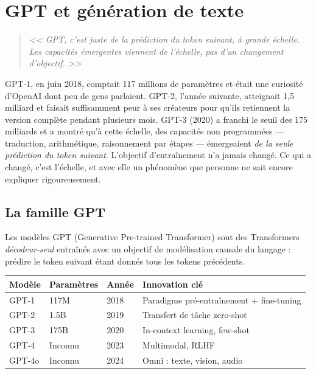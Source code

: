 \chapter{GPT et g\'en\'eration de texte}
\label{ch:gpt-generation}

\begin{quote}
\emph{<< GPT, c'est juste de la pr\'ediction du token suivant, \`a grande \'echelle. Les capacit\'es \'emergentes viennent de l'\'echelle, pas d'un changement d'objectif. >>}
\end{quote}

GPT-1, en juin 2018, comptait 117 millions de paramètres et était une curiosité d'OpenAI dont peu de gens parlaient. GPT-2, l'année suivante, atteignait 1,5 milliard et faisait suffisamment peur à ses créateurs pour qu'ils retiennent la version complète pendant plusieurs mois. GPT-3 (2020) a franchi le seuil des 175 milliards et a montré qu'à cette échelle, des capacités non programmées --- traduction, arithmétique, raisonnement par étapes --- émergeaient \emph{de la seule prédiction du token suivant}. L'objectif d'entraînement n'a jamais changé. Ce qui a changé, c'est l'échelle, et avec elle un phénomène que personne ne sait encore expliquer rigoureusement.
\section{La famille GPT}

Les mod\`eles GPT (Generative Pre-trained Transformer) sont des Transformers \emph{d\'ecodeur-seul} entra\^in\'es avec un objectif de mod\'elisation causale du langage : pr\'edire le token suivant \'etant donn\'es tous les tokens pr\'ec\'edents.

\begin{longtable}{p{2.5cm}p{2.5cm}p{2.5cm}p{4.5cm}}
\toprule
\textbf{Mod\`ele} & \textbf{Param\`etres} & \textbf{Ann\'ee} & \textbf{Innovation cl\'e} \\
\midrule
GPT-1 & 117M & 2018 & Paradigme pr\'e-entra\^inement + fine-tuning \\
GPT-2 & 1.5B & 2019 & Transfert de t\^ache zero-shot \\
GPT-3 & 175B & 2020 & In-context learning, few-shot \\
GPT-4 & Inconnu & 2023 & Multimodal, RLHF \\
GPT-4o & Inconnu & 2024 & Omni : texte, vision, audio \\
\bottomrule
\end{longtable}

